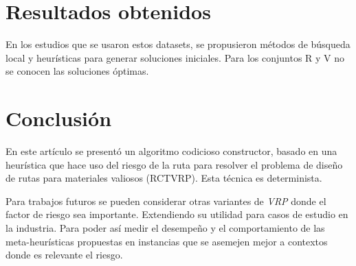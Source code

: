 \documentclass[conference]{IEEEtran}
\begin{document}
\section{Resultados obtenidos}

En los estudios que se usaron estos datasets, se propusieron métodos de búsqueda local y heurísticas para generar soluciones iniciales. Para los conjuntos R y V no se conocen las soluciones óptimas.


\section{Conclusión}

En este artículo se presentó un algoritmo codicioso constructor, basado en una heurística que hace uso del riesgo de la ruta para resolver el problema de diseño de rutas para materiales valiosos (RCTVRP). Esta técnica es determinista.

Para trabajos futuros se pueden considerar otras variantes de \textit{VRP} donde el factor de riesgo sea importante. Extendiendo su utilidad para casos de estudio en la industria. Para poder así medir el desempeño y el comportamiento de las meta-heurísticas propuestas en instancias que se asemejen mejor a contextos donde es relevante el riesgo.


%
%

\end{document}

